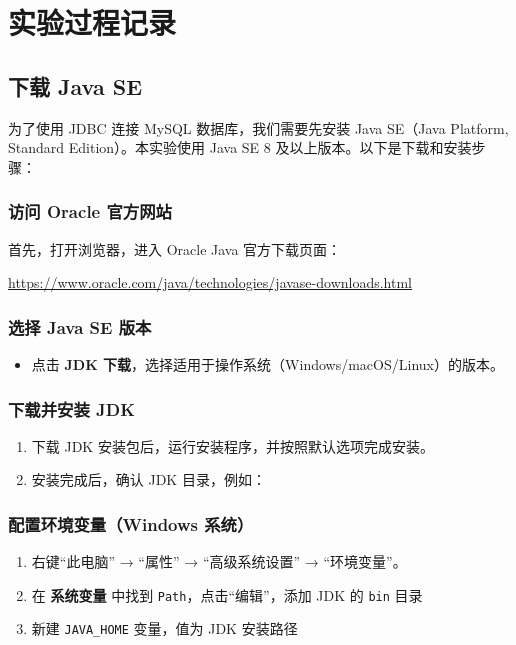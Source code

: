 \documentclass{article}
\begin{document}
	\section{实验过程记录}
	
	\subsection{下载 Java SE}
	
	为了使用 JDBC 连接 MySQL 数据库，我们需要先安装 Java SE（Java Platform, Standard Edition）。本实验使用 Java SE 8 及以上版本。以下是下载和安装步骤：
	
	\subsubsection{访问 Oracle 官方网站}
	首先，打开浏览器，进入 Oracle Java 官方下载页面：
	
	\begin{center}
		\url{https://www.oracle.com/java/technologies/javase-downloads.html}
	\end{center}
	
	\subsubsection{选择 Java SE 版本}
	
	\begin{itemize}
		\item 点击 \textbf{JDK 下载}，选择适用于操作系统（Windows/macOS/Linux）的版本。
	\end{itemize}
	
	\subsubsection{下载并安装 JDK}
	\begin{enumerate}
		\item 下载 JDK 安装包后，运行安装程序，并按照默认选项完成安装。
		\item 安装完成后，确认 JDK 目录，例如：
		
	\end{enumerate}
	
	\subsubsection{配置环境变量（Windows 系统）}
	\begin{enumerate}
		\item 右键“此电脑” → “属性” → “高级系统设置” → “环境变量”。
		\item 在 \textbf{系统变量} 中找到 \texttt{Path}，点击“编辑”，添加 JDK 的 \texttt{bin} 目录
		\item 新建 \texttt{JAVA\_HOME} 变量，值为 JDK 安装路径
	\end{enumerate}
	
\end{document}

